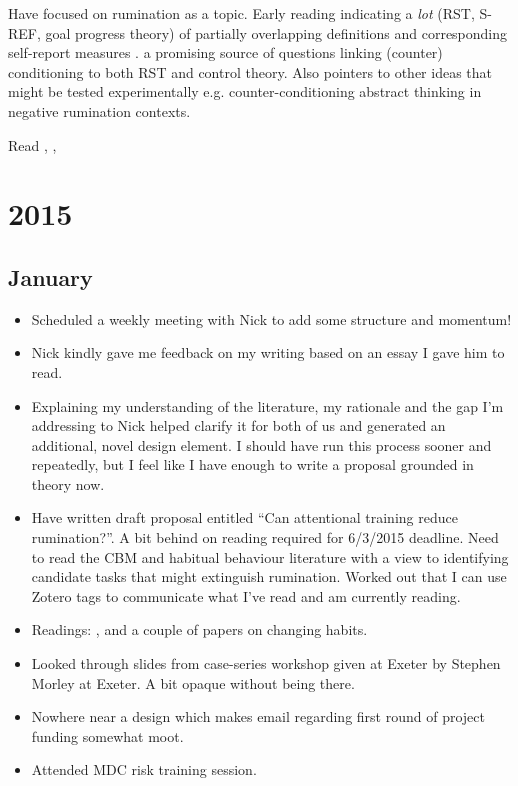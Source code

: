 \documentclass[british]{article}
\begin{document}
Have focused on rumination as a topic. Early reading indicating a
\textit{lot} (RST, S-REF, goal progress theory) of partially overlapping
definitions and corresponding self-report measures \parencite[][p.
206]{papageorgiou_depressive_2004}. \textcite{watkins_habitgoal_2014}
a promising source of questions linking (counter) conditioning to both
RST and control theory. Also pointers to other ideas that might be tested
experimentally e.g. counter-conditioning abstract thinking in negative
rumination contexts.

Read \textcite{watkins_habitgoal_2014}, \textcite[][Chapters 1,
10 (WBSI) and 9, which is a fairly brief summary and comparison
of the main theories in chapters 6-8]{martin_ruminative_1996},
\textcite[][]{smith_roadmap_2009}

\section{2015}

\subsection{January}

\begin{itemize}
  \item Scheduled a weekly meeting with Nick to add some structure and momentum!

  \item Nick kindly gave me feedback on my writing based on an essay I
  gave him to read.

  \item Explaining my understanding of the literature, my rationale and
  the gap I'm addressing to Nick helped clarify it for both of us and
  generated an additional, novel design element. I should have run this
  process sooner and repeatedly, but I feel like I have enough to write
  a proposal grounded in theory now.

  \item Have written draft proposal entitled ``Can attentional training
    reduce rumination?''. A bit behind on reading required for 6/3/2015
    deadline. Need to read the CBM and habitual behaviour literature
    with a view to identifying candidate tasks that might extinguish
    rumination. Worked out that I can use Zotero tags to communicate
    what I've read and am currently reading.

  \item Readings: \parencite{koster_understanding_2011},
    \parencite{almeida_cognitive_2014} and a couple of papers on changing habits.

  \item Looked through slides from case-series workshop given at Exeter
  by Stephen Morley at Exeter. A bit opaque without being there.

  \item Nowhere near a design which makes email regarding first round of project
  funding somewhat moot.

  \item Attended MDC risk training session.
\end{itemize}
\end{document}
